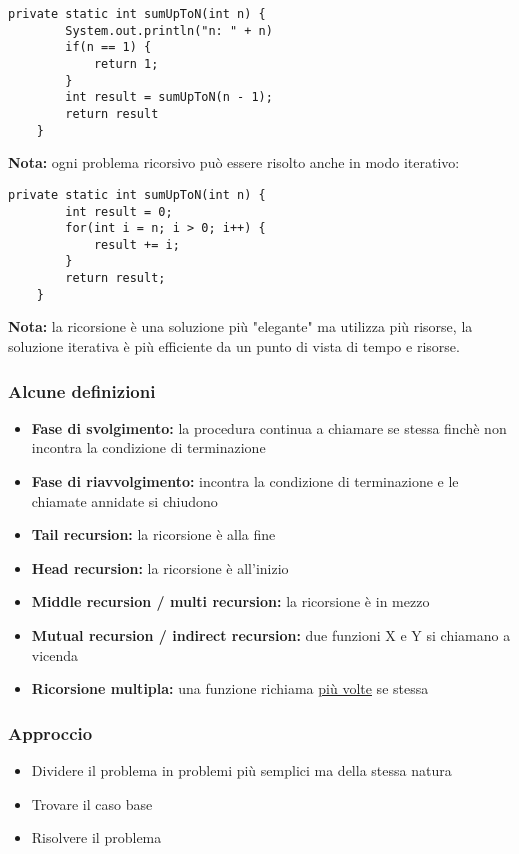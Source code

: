 \documentclass[../main.tex]{subfiles}
\begin{document}
\begin{lstlisting}[style=java]
    private static int sumUpToN(int n) {
        System.out.println("n: " + n)
        if(n == 1) {
            return 1;
        }
        int result = sumUpToN(n - 1);
        return result
    }
\end{lstlisting}

\textbf{Nota:} ogni problema ricorsivo può essere risolto anche in modo iterativo:
\begin{lstlisting}[style=java]
    private static int sumUpToN(int n) {
        int result = 0;
        for(int i = n; i > 0; i++) {
            result += i;
        }
        return result;
    }
\end{lstlisting}

\vspace{0.5cm}
\textbf{Nota:} la ricorsione è una soluzione più "elegante" ma utilizza più risorse, la soluzione iterativa è più efficiente
da un punto di vista di tempo e risorse.

\subsubsection{Alcune definizioni}
\begin{itemize}
    \item \textbf{Fase di svolgimento:} la procedura continua a chiamare se stessa finchè non incontra la condizione di terminazione
    \item \textbf{Fase di riavvolgimento:} incontra la condizione di terminazione e le chiamate annidate si chiudono
\end{itemize}
\vspace{0.5cm}
\begin{itemize}
    \item \textbf{Tail recursion:} la ricorsione è alla fine
    \item \textbf{Head recursion:} la ricorsione è all'inizio
    \item \textbf{Middle recursion / multi recursion:} la ricorsione è in mezzo
\end{itemize}
\vspace{0.5cm}
\begin{itemize}
    \item \textbf{Mutual recursion / indirect recursion:} due funzioni X e Y si chiamano a vicenda
    \item \textbf{Ricorsione multipla:} una funzione richiama \underline{più volte} se stessa
\end{itemize}

\subsubsection{Approccio}
\begin{itemize}
    \item Dividere il problema in problemi più semplici ma della stessa natura
    \item Trovare il caso base
    \item Risolvere il problema
\end{itemize}
\end{document}
